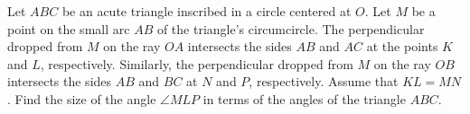 Let $ABC$ be an acute triangle inscribed in a circle centered at $O$. Let $M$ be a point on the small arc $AB$ of the triangle's circumcircle. The perpendicular dropped from $M$ on the ray $OA$ intersects the sides $AB$ and $AC$ at the points $K$ and $L$,  respectively. Similarly, the perpendicular dropped from $M$ on the ray $OB$ intersects the sides $AB$ and $BC$ at $N$ and $P$,  respectively. Assume that $KL=MN$. Find the size of the angle $\angle{MLP}$ in terms of the angles of the triangle $ABC$.